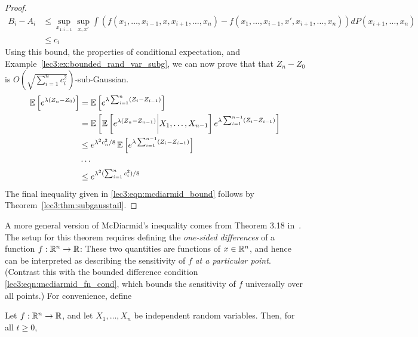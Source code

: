 \begin{proof}
\begin{align*}
        B_i - A_i &\leq \sup_{x_{1:i - 1}} \sup_{x, x'} \int \left (f(x_1,\dots,x_{i - 1}, x, x_{i + 1},\dots,x_n) - f(x_1,\dots,x_{i - 1}, x', x_{i + 1},\dots,x_n)\right) dP(x_{i + 1},\dots,x_n) \\
        &\leq c_i
    \end{align*}
    Using this bound, the properties of conditional expectation, and Example~\ref{lec3:ex:bounded_rand_var_subg}, we can now prove that that $Z_n - Z_0$ is $O\left(\sqrt{\sum_{i = 1}^n c_i^2}\right)$-sub-Gaussian.
    \begin{align*}
        \operatorname*{\mathbb{E}} \left[e^{\lambda(Z_n - Z_0)} \right] &= \operatorname*{\mathbb{E}} \left[e^{\lambda \sum_{i = 1}^n (Z_i - Z_{i - 1})} \right] \\
        &= \operatorname*{\mathbb{E}} \left[ \operatorname*{\mathbb{E}} \left[e^{\lambda (Z_n - Z_{n - 1})} \biggr\lvert X_1,\dots,X_{n - 1} \right]e^{\lambda \sum_{i = 1}^{n - 1} (Z_i - Z_{i - 1})} \right] \\
        &\leq e^{\lambda^2 c_n^2/8} \operatorname*{\mathbb{E}} \left[ e^{\lambda \sum_{i = 1}^{n - 1} (Z_i - Z_{i - 1})} \right] \\
        &\cdots \\
        &\leq e^{\lambda^2 (\sum_{i = 1}^n c_i^2)/8}
    \end{align*}
    The final inequality given in \eqref{lec3:eqn:mcdiarmid_bound} follows by Theorem~\ref{lec3:thm:subgausstail}.
\end{proof}

A more general version of McDiarmid's inequality comes from Theorem 3.18 in~\cite{vanhandel2016high}. The setup for this theorem requires defining the \emph{one-sided differences} of a function $f : \mathbb R^n \to \mathbb R$:
These two quantities are functions of $x \in \mathbb R^n$, and hence can be interpreted as describing the sensitivity of $f$ \emph{at a particular point}. (Contrast this with the bounded difference condition \eqref{lec3:eqn:mcdiarmid_fn_cond}, which bounds the sensitivity of $f$ universally over all points.) For convenience, define
\begin{theorem}
    Let $f : \mathbb R^n \to \mathbb R$, and let $X_1, \ldots, X_n$ be independent random variables. Then, for all $t \geq 0$,
\end{theorem}

